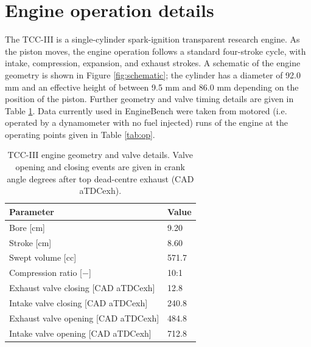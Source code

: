 \documentclass{article}
\begin{document}
\section{Engine operation details}
\label{app:exp}
The TCC-III is a single-cylinder spark-ignition transparent research engine. As the piston moves, the engine operation follows a standard four-stroke cycle, with intake, compression, expansion, and exhaust strokes. 
A schematic of the engine geometry is shown in Figure \ref{fig:schematic}; the cylinder has a diameter of 92.0 mm and an effective height of between 9.5 mm and 86.0 mm depending on the position of the piston. Further geometry and valve timing details are given in Table \ref{tab:valves}. Data currently used in EngineBench were taken from motored (i.e. operated by a dynamometer with no fuel injected) runs of the engine at the operating points given in Table \ref{tab:op}. 

\begin{table}[h]
\caption{TCC-III engine geometry and valve details. Valve opening and closing events are given in crank angle degrees after top dead-centre exhaust (CAD aTDCexh).}
\label{tab:valves}
\centering
\begin{tabular}{ll}
\toprule
\textbf{Parameter}                 & \textbf{Value} \\ \midrule
Bore [cm]                           & 9.20           \\
Stroke [cm]                         & 8.60           \\
Swept volume [cc]                      & 571.7          \\
Compression ratio [$-$] & 10:1 \\
Exhaust valve closing [CAD aTDCexh] & 12.8           \\
Intake valve closing [CAD aTDCexh]  & 240.8          \\
Exhaust valve opening [CAD aTDCexh] & 484.8          \\
Intake valve opening [CAD aTDCexh]  & 712.8          \\ \bottomrule
\end{tabular}
\end{table}
\end{document}
